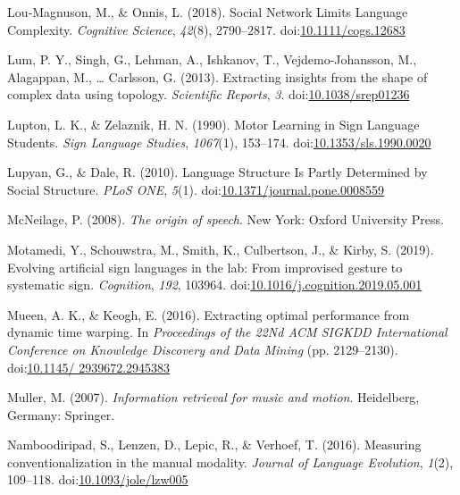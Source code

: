 \documentclass[
  man, noextraspace,floatsintext]{apa6}
\newlength{\cslhangindent}
\newenvironment{cslreferences}%
  {\setlength{\parindent}{0pt}%
  \everypar{\setlength{\hangindent}{\cslhangindent}}\ignorespaces}%
  {\par}
\begin{document}
\begin{cslreferences}
\leavevmode\hypertarget{ref-lou-magnusonSocialNetworkLimits2018}{}%
Lou‐Magnuson, M., \& Onnis, L. (2018). Social Network Limits Language Complexity. \emph{Cognitive Science}, \emph{42}(8), 2790--2817. doi:\href{https://doi.org/10.1111/cogs.12683}{10.1111/cogs.12683}

\leavevmode\hypertarget{ref-lumExtractingInsightsShape2013}{}%
Lum, P. Y., Singh, G., Lehman, A., Ishkanov, T., Vejdemo-Johansson, M., Alagappan, M., \ldots{} Carlsson, G. (2013). Extracting insights from the shape of complex data using topology. \emph{Scientific Reports}, \emph{3}. doi:\href{https://doi.org/10.1038/srep01236}{10.1038/srep01236}

\leavevmode\hypertarget{ref-luptonMotorLearningSign1990}{}%
Lupton, L. K., \& Zelaznik, H. N. (1990). Motor Learning in Sign Language Students. \emph{Sign Language Studies}, \emph{1067}(1), 153--174. doi:\href{https://doi.org/10.1353/sls.1990.0020}{10.1353/sls.1990.0020}

\leavevmode\hypertarget{ref-lupyanLanguageStructurePartly2010}{}%
Lupyan, G., \& Dale, R. (2010). Language Structure Is Partly Determined by Social Structure. \emph{PLoS ONE}, \emph{5}(1). doi:\href{https://doi.org/10.1371/journal.pone.0008559}{10.1371/journal.pone.0008559}

\leavevmode\hypertarget{ref-mcneilageOriginSpeech2008}{}%
McNeilage, P. (2008). \emph{The origin of speech}. New York: Oxford University Press.

\leavevmode\hypertarget{ref-motamediEvolvingArtificialSign2019}{}%
Motamedi, Y., Schouwstra, M., Smith, K., Culbertson, J., \& Kirby, S. (2019). Evolving artificial sign languages in the lab: From improvised gesture to systematic sign. \emph{Cognition}, \emph{192}, 103964. doi:\href{https://doi.org/10.1016/j.cognition.2019.05.001}{10.1016/j.cognition.2019.05.001}

\leavevmode\hypertarget{ref-mueenExtractingOptimalPerformance2016a}{}%
Mueen, A. K., \& Keogh, E. (2016). Extracting optimal performance from dynamic time warping. In \emph{Proceedings of the 22Nd ACM SIGKDD International Conference on Knowledge Discovery and Data Mining} (pp. 2129--2130). doi:\href{https://doi.org/10.1145/\%202939672.2945383}{10.1145/ 2939672.2945383}

\leavevmode\hypertarget{ref-mullerInformationRetrievalMusic2007}{}%
Muller, M. (2007). \emph{Information retrieval for music and motion}. Heidelberg, Germany: Springer.

\leavevmode\hypertarget{ref-namboodiripadMeasuringConventionalizationManual2016}{}%
Namboodiripad, S., Lenzen, D., Lepic, R., \& Verhoef, T. (2016). Measuring conventionalization in the manual modality. \emph{Journal of Language Evolution}, \emph{1}(2), 109--118. doi:\href{https://doi.org/10.1093/jole/lzw005}{10.1093/jole/lzw005}


\end{cslreferences}
\end{document}
